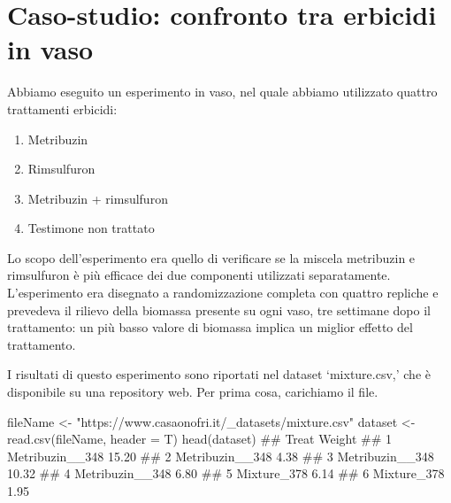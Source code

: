 \documentclass[a4paper,12pt,oneside]{book}
\providecommand{\tightlist}{%
  \setlength{\itemsep}{0pt}\setlength{\parskip}{0pt}}
\newenvironment{Shaded}{\begin{snugshade}}{\end{snugshade}}
\newcommand{\StringTok}[1]{#1}
\newcommand{\DocumentationTok}[1]{#1}
\newcommand{\OtherTok}[1]{#1}
\newcommand{\FunctionTok}[1]{#1}
\newcommand{\AttributeTok}[1]{#1}
\newcommand{\NormalTok}[1]{#1}
\begin{document}
\hypertarget{caso-studio-confronto-tra-erbicidi-in-vaso}{%
\section{Caso-studio: confronto tra erbicidi in vaso}\label{caso-studio-confronto-tra-erbicidi-in-vaso}}

Abbiamo eseguito un esperimento in vaso, nel quale abbiamo utilizzato quattro trattamenti erbicidi:

\begin{enumerate}
\def\labelenumi{\arabic{enumi}.}
\tightlist
\item
  Metribuzin
\item
  Rimsulfuron
\item
  Metribuzin + rimsulfuron
\item
  Testimone non trattato
\end{enumerate}

Lo scopo dell'esperimento era quello di verificare se la miscela metribuzin e rimsulfuron è più efficace dei due componenti utilizzati separatamente. L'esperimento era disegnato a randomizzazione completa con quattro repliche e prevedeva il rilievo della biomassa presente su ogni vaso, tre settimane dopo il trattamento: un più basso valore di biomassa implica un miglior effetto del trattamento.

I risultati di questo esperimento sono riportati nel dataset `mixture.csv,' che è disponibile su una repository web. Per prima cosa, carichiamo il file.

\vspace{12pt}

\begin{Shaded}
\begin{Highlighting}[]
\NormalTok{fileName }\OtherTok{\textless{}{-}} \StringTok{"https://www.casaonofri.it/\_datasets/mixture.csv"}
\NormalTok{dataset }\OtherTok{\textless{}{-}} \FunctionTok{read.csv}\NormalTok{(fileName, }\AttributeTok{header =}\NormalTok{ T)}
\FunctionTok{head}\NormalTok{(dataset)}
\DocumentationTok{\#\#             Treat Weight}
\DocumentationTok{\#\# 1 Metribuzin\_\_348  15.20}
\DocumentationTok{\#\# 2 Metribuzin\_\_348   4.38}
\DocumentationTok{\#\# 3 Metribuzin\_\_348  10.32}
\DocumentationTok{\#\# 4 Metribuzin\_\_348   6.80}
\DocumentationTok{\#\# 5     Mixture\_378   6.14}
\DocumentationTok{\#\# 6     Mixture\_378   1.95}
\end{Highlighting}
\end{Shaded}
\end{document}
